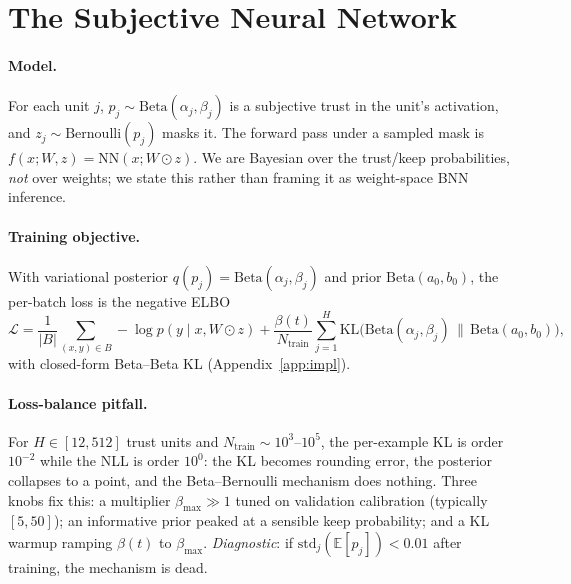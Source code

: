 \documentclass[11pt]{article}
\newcommand{\Eb}{\mathbb{E}}
\newcommand{\KL}{\mathrm{KL}}
\begin{document}
\section{The Subjective Neural Network}
\paragraph{Model.}
For each unit $j$, $p_j\sim\mathrm{Beta}(\alpha_j,\beta_j)$ is a subjective trust in the
unit's activation, and $z_j\sim\mathrm{Bernoulli}(p_j)$ masks it. The forward pass under
a sampled mask is $f(x;W,z)=\mathrm{NN}(x;W\odot z)$. We are Bayesian over the
trust/keep probabilities, \emph{not} over weights; we state this rather than framing it
as weight-space BNN inference.

\paragraph{Training objective.}
With variational posterior $q(p_j)=\mathrm{Beta}(\alpha_j,\beta_j)$ and prior
$\mathrm{Beta}(a_0,b_0)$, the per-batch loss is the negative ELBO
\begin{equation}
\mathcal L=\frac{1}{|B|}\!\sum_{(x,y)\in B}\!-\log p(y\mid x,W\odot z)
+\frac{\beta(t)}{N_{\text{train}}}\sum_{j=1}^{H}
\KL\!\big(\mathrm{Beta}(\alpha_j,\beta_j)\,\|\,\mathrm{Beta}(a_0,b_0)\big),
\label{eq:elbo}
\end{equation}
with closed-form Beta--Beta KL (Appendix~\ref{app:impl}).

\paragraph{Loss-balance pitfall.}
For $H\!\in\![12,512]$ trust units and $N_{\text{train}}\!\sim\!10^3$--$10^5$, the
per-example KL is order $10^{-2}$ while the NLL is order $10^0$: the KL becomes rounding
error, the posterior collapses to a point, and the Beta--Bernoulli mechanism does
nothing. Three knobs fix this: a multiplier $\beta_{\max}\!\gg\!1$ tuned on validation
calibration (typically $[5,50]$); an informative prior peaked at a sensible keep
probability; and a KL warmup ramping $\beta(t)$ to $\beta_{\max}$. \emph{Diagnostic}: if
$\mathrm{std}_j(\Eb[p_j])<0.01$ after training, the mechanism is dead.
\end{document}
